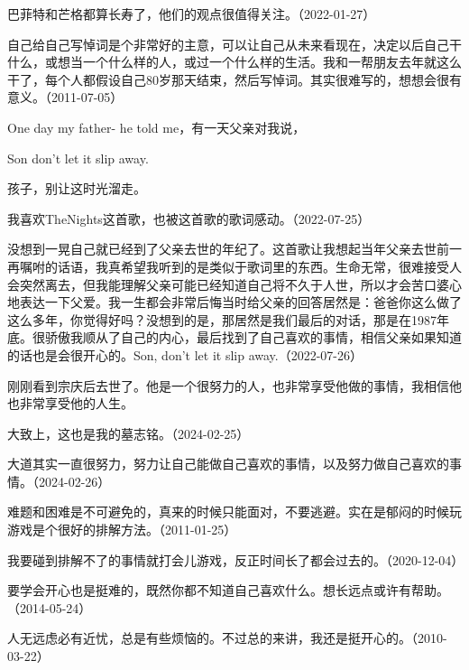 巴菲特和芒格都算长寿了，他们的观点很值得关注。（2022-01-27）

自己给自己写悼词是个非常好的主意，可以让自己从未来看现在，决定以后自己干什么，或想当一个什么样的人，或过一个什么样的生活。我和一帮朋友去年就这么干了，每个人都假设自己80岁那天结束，然后写悼词。其实很难写的，想想会很有意义。（2011-07-05）

One day my father- he told me，有一天父亲对我说，

Son don't let it slip away.

孩子，别让这时光溜走。

我喜欢TheNights这首歌，也被这首歌的歌词感动。（2022-07-25）

没想到一晃自己就已经到了父亲去世的年纪了。这首歌让我想起当年父亲去世前一再嘱咐的话语，我真希望我听到的是类似于歌词里的东西。生命无常，很难接受人会突然离去，但我能理解父亲可能已经知道自己将不久于人世，所以才会苦口婆心地表达一下父爱。我一生都会非常后悔当时给父亲的回答居然是：爸爸你这么做了这么多年，你觉得好吗？没想到的是，那居然是我们最后的对话，那是在1987年底。很骄傲我顺从了自己的内心，最后找到了自己喜欢的事情，相信父亲如果知道的话也是会很开心的。Son, don't let it slip away.（2022-07-26）

刚刚看到宗庆后去世了。他是一个很努力的人，也非常享受他做的事情，我相信他也非常享受他的人生。

大致上，这也是我的墓志铭。（2024-02-25）

大道其实一直很努力，努力让自己能做自己喜欢的事情，以及努力做自己喜欢的事情。（2024-02-26）


难题和困难是不可避免的，真来的时候只能面对，不要逃避。实在是郁闷的时候玩游戏是个很好的排解方法。（2011-01-25）


我要碰到排解不了的事情就打会儿游戏，反正时间长了都会过去的。（2020-12-04）


要学会开心也是挺难的，既然你都不知道自己喜欢什么。想长远点或许有帮助。（2014-05-24）


人无远虑必有近忧，总是有些烦恼的。不过总的来讲，我还是挺开心的。（2010-03-22）


